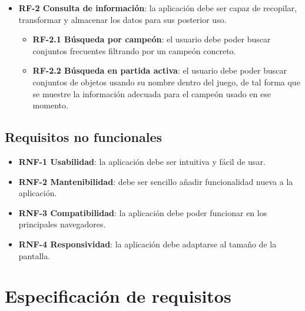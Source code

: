 \begin{itemize}
	\item \textbf{RF-2 Consulta de información}: la aplicación debe ser capaz de recopilar, transformar y almacenar los datos para sus posterior uso.
	\begin{itemize}
		\item \textbf{RF-2.1 Búsqueda por campeón}: el usuario debe poder buscar conjuntos frecuentes filtrando por un campeón concreto.
		\item \textbf{RF-2.2 Búsqueda en partida activa}: el usuario debe poder buscar conjuntos de objetos usando su nombre dentro del juego, de tal forma que se muestre la información adecuada para el campeón usado en ese momento.
	\end{itemize}
\end{itemize}

\subsection{Requisitos no funcionales}
\begin{itemize}
	\item \textbf{RNF-1 Usabilidad}: la aplicación debe ser intuitiva y fácil de usar.
	\item \textbf{RNF-2 Mantenibilidad}: debe ser sencillo añadir funcionalidad nueva a la aplicación.
	\item \textbf{RNF-3 Compatibilidad}: la aplicación debe poder funcionar en	los principales navegadores.
	\item \textbf{RNF-4 Responsividad}: la aplicación debe adaptarse al tamaño	de la pantalla.
\end{itemize}

\section{Especificación de requisitos}


